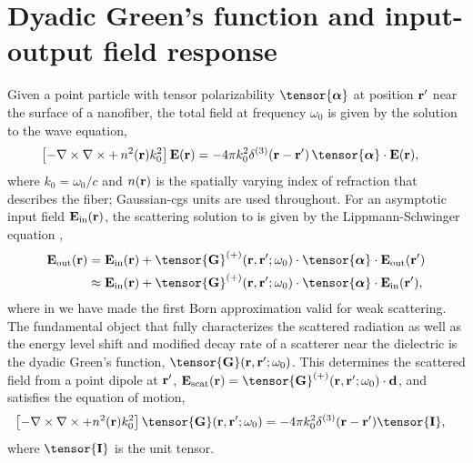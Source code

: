\documentclass[preprint, aps,pra,onecolumn]{revtex4-1} %
\newcommand{\inp}{{\rm in}}
\newcommand{\out}{{\rm out}}
\newcommand{\unittens}{\tensor{\mathbf{I}}}
\begin{document}
\section{Dyadic Green's function and input-output field response}

Given a point particle with tensor polarizability $\tensor{\boldsymbol{\alpha}}$ at position $\mathbf{r}'$ near the surface of a nanofiber, the total field  at frequency $\omega_0$ is given by the solution to the wave equation, 
	\begin{align}\label{Eq::WaveEquationSource}
		\left[ - \nabla \times\nabla \times + \, n^2(\br)k_0^2 \right] \mathbf{E}(\br) &= -4\pi  k_0^2 \delta^{(3)}(\br-\br')\,  \tensor{\boldsymbol{\alpha}}\cdot \mathbf{E}(\br),
	\end{align}
where $k_0=\omega_0/c$ and $n(\mathbf{r})$ is the spatially varying index of refraction that describes the fiber; Gaussian-cgs units are used throughout.  
For an asymptotic input field $\mathbf{E}_{\inp}(\br)$, the scattering solution to  is given by the Lippmann-Schwinger equation \cite{wubs_multiple-scattering_2004},
	\begin{align}
		\mathbf{E}_{\out}(\br) &=\mathbf{E}_{\inp}(\br)+\tensor{\mathbf{G}}^{(+)}(\br , \br'; \omega_0)\cdot 
\tensor{\boldsymbol{\alpha}}\cdot \mathbf{E}_{\out}(\br')\\
		&\approx \mathbf{E}_{\inp}(\br)+ \tensor{\mathbf{G}}^{(+)}(\br , \br'; \omega_0) \cdot 
\tensor{\boldsymbol{\alpha}}\cdot \mathbf{E}_{\inp}(\br'), \label{Eq::ScatteredField}
	\end{align}
where in  we have made the first Born approximation valid for weak scattering. The fundamental object that fully characterizes the scattered radiation as well as the energy level shift and modified decay rate of a scatterer near the dielectric is the dyadic Green's function, $\tensor{\mathbf{G}}(\br, \br';\omega_0)$. This determines the scattered field from a point dipole at $\mathbf{r}'$, $\mathbf{E}_{\rm scat}(\br)= \tensor{\mathbf{G}}^{(+)}(\br , \br'; \omega_0)\cdot \mathbf{d}$, and satisfies the equation of motion,
	\begin{align} \label{Eq::GreensDiffEq}
		\left[ -\nabla\times\nabla\times + n^2(\mbf{r}) k_0^2 \right] \tensor{\mathbf{G}}(\br, \br';\omega_0) &= -4\pi 
k_0^2 \delta^{(3)}(\mathbf{r}-\mathbf{r}') \unittens,
	\end{align}
where $\unittens$ is the unit tensor.   
\end{document}
